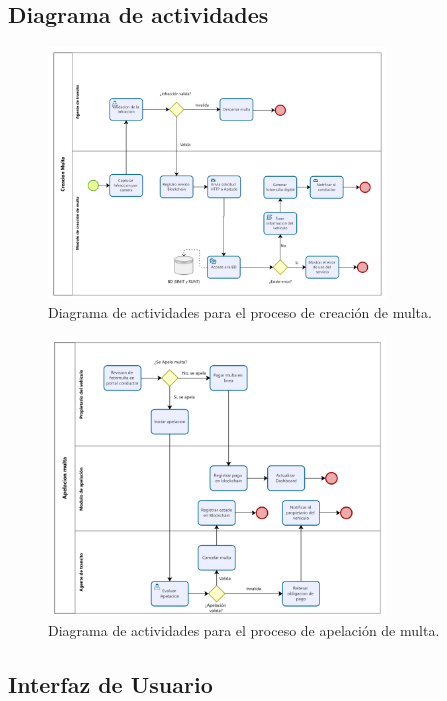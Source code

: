 \subsection{ Diagrama de actividades }
 \begin{figure}[htbp]
    \centering
    \includegraphics[width=0.8\textwidth]{Images/ActMulta.png}
    \caption{Diagrama de actividades para el proceso de creación de multa.}
    \label{fig:diagrama_creacion_multa}
\end{figure}
 \begin{figure}[htbp]
    \centering
    \includegraphics[width=0.8\textwidth]{Images/ActApelacion.png}
    \caption{Diagrama de actividades para el proceso de apelación de multa.}
    \label{fig:diagrama_apelacion_2}
\end{figure}

\subsection{Interfaz de Usuario}
